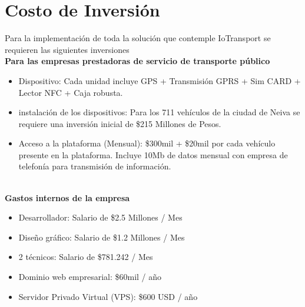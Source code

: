 \documentclass[letterpaper]{twentysecondcv} %
\begin{document}
\section{Costo de Inversión}

\begin{twenty}
    \twentyitem
    {}
    {}
    {}
    {}
    {}
    {Para la implementación de toda la solución que contemple IoTransport se requieren las siguientes inversiones \\
    
    \textbf{Para las empresas prestadoras de servicio de transporte público} \\
    \begin{itemize}
        \item Dispositivo: Cada unidad incluye GPS + Transmisión GPRS + Sim CARD + Lector NFC + Caja robusta. \\
        \item instalación de los dispositivos: Para los 711 vehículos de la ciudad de Neiva se requiere una inversión inicial de \$215 Millones de Pesos. \\
        \item Acceso a la plataforma (Mensual): \$300mil + \$20mil por cada vehículo presente en la plataforma. Incluye 10Mb de datos mensual con empresa de telefonía para transmisión de información. \\ \\
    \end{itemize}
    
    \textbf{Gastos internos de la empresa} \\
    \begin{itemize}
        \item Desarrollador: Salario de \$2.5 Millones / Mes \\
        \item Diseño gráfico: Salario de \$1.2 Millones / Mes \\
        \item 2 técnicos: Salario de \$781.242 / Mes \\
        \item Dominio web empresarial: \$60mil / año \\
        \item Servidor Privado Virtual (VPS): \$600 USD / año \\
    \end{itemize}
    
    
    
    }
    
 
\end{twenty}
\end{document}
